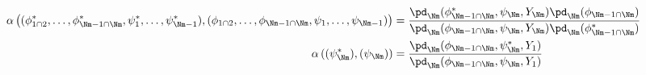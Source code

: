 \begin{align}
  \alpha\left(
    (\phi_{1 \cap 2}^{*}, \ldots, \phi_{\Nm - 1 \cap \Nm}^{*}, \psi_{1}^{*}, \ldots, \psi_{\Nm - 1}^{*}),
    (\phi_{1 \cap 2}, \ldots, \phi_{\Nm - 1 \cap \Nm}, \psi_{1}, \ldots, \psi_{\Nm - 1})
  \right)
  &= 
  \frac {
    \pd_{\Nm}(\phi_{\Nm - 1 \cap \Nm}^{*}, \psi_{\Nm}, Y_{\Nm})
    \pd_{\Nm}(\phi_{\Nm - 1 \cap \Nm})
  } {
    \pd_{\Nm}(\phi_{\Nm - 1 \cap \Nm}, \psi_{\Nm}, Y_{\Nm})
    \pd_{\Nm}(\phi_{\Nm - 1 \cap \Nm}^{*})
  } \\ 
  \alpha\left(
    (\psi_{\Nm}^{*}),
    (\psi_{\Nm})
  \right)
  &=  
  \frac {
    \pd_{\Nm}(\phi_{\Nm - 1 \cap \Nm}, \psi_{\Nm}^{*}, Y_{1})
  } {
    \pd_{\Nm}(\phi_{\Nm - 1 \cap \Nm}, \psi_{\Nm}, Y_{1})
  } 
  \label{eqn:stage-M-acceptance-probabilities}
\end{align}